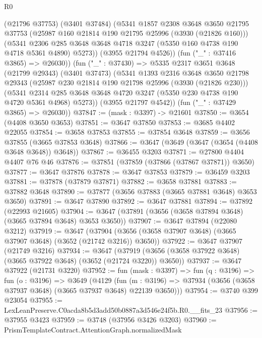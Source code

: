 \begin{lexlean}{R0}
\begin{coremodule}
          (@21796 @37753)
          (@3401 @37484)
          (@5341
            @1857
            @2308
            @3648
            @3650
            @21795
            @37753
            (@25987 @160 @21814 @190 @21795 @25996 (@3930 (@21826 @160)))
            (@5341
              @2306
              @285
              @3648
              @3648
              @4718
              @3247
              (@5350 @160 @4738 @190 @4718 @5361 @4890)
              @5273))
          (@3955 @21794 @4526))
        (fun ("_" : @37416 @3865) => @26030))
      (fun ("_" : @37430) =>
      @5335
        @2317
        @3651
        @3648
        (@21799 @29343)
        (@3401 @37473)
        (@5341
          @1393
          @2316
          @3648
          @3650
          @21798
          @29343
          (@25987 @230 @21814 @190 @21798 @25996 (@3930 (@21826 @230)))
          (@5341
            @2314
            @285
            @3648
            @3648
            @4720
            @3247
            (@5350 @230 @4738 @190 @4720 @5361 @4968)
            @5273))
        (@3955 @21797 @4542))
      (fun ("_" : @37429 @3865) => @26030))
@37847 := (mask : @3397) -> @21601
@37850 := @3654 (@4408 @3650 @3653)
@37851 := @3647 @37850
@37853 := @3685 @4402 @22055
@37854 := @3658 @37853
@37855 := @37854 @3648
@37859 := @3656 @37855 (@3665 @37853 @3648)
@37866 := @3647 (@3649 (@3647 (@3654 (@4408 @3648 @3648)) @3648))
@37867 := @36455 @3203
@37871 := @27800 @4404 @4407 @76 @46
@37876 := @37851 (@37859 (@37866 (@37867 @37871)) @3650)
@37877 := @3647 @37876
@37878 := @3647 @37853
@37879 := @36459 @3203
@37881 := @37878 (@37879 @37871)
@37882 := @3658 @37881
@37883 := @37882 @3648
@37890 := @37877 (@3656 @37883 (@3665 @37881 @3648) @3653 @3650)
@37891 := @3647 @37890
@37892 := @3647 @37881
@37894 := @37892 (@22993 @21605)
@37904 := @3647 (@37891 (@3656 (@3658 @37894 @3648) (@3665 @37894 @3648) @3653 @3650))
@37907 := @3647 @37894 (@22080 @3212)
@37919 := @3647
    (@37904 (@3656 (@3658 @37907 @3648) (@3665 @37907 @3648) (@3652 (@21742 @3216)) @3650))
@37922 := @3647 @37907 (@21749 @3216)
@37934 := @3647
    (@37919 (@3656 (@3658 @37922 @3648) (@3665 @37922 @3648) (@3652 (@21724 @3220)) @3650))
@37937 := @3647 @37922 (@21731 @3220)
@37952 := fun (mask : @3397) =>
  fun (q : @3196) =>
  fun (o : @3196) =>
  @3649
    (@4129
      (fun (m : @3196) => @37934 (@3656 (@3658 @37937 @3648) (@3665 @37937 @3648) @22139 @3650)))
@37954 := @3740 @399 @23054
@37955 := LexLeanPreserve.C0acda8b5d3add50b0887a3d546e24f5b.R0.__fits_23
@37956 := @37955 @3423
@37959 := @3748 (@37956 @3426 @3203)
@37960 := PrismTemplateContract.AttentionGraph.normalizedMask

\end{coremodule}
\end{lexlean}
